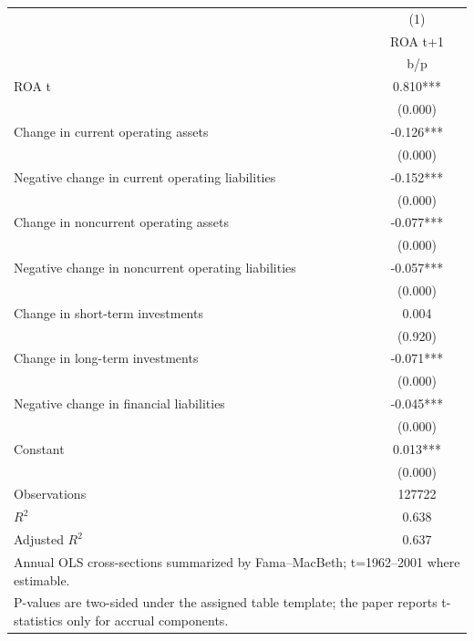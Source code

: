 {
\def\sym#1{\ifmmode^{#1}\else\(^{#1}\)\fi}
\begin{tabular}{l*{1}{c}}
\hline\hline
                    &\multicolumn{1}{c}{(1)}\\
                    &\multicolumn{1}{c}{ROA t+1}\\
                    &         b/p   \\
\hline
ROA t               &       0.810***\\
                    &     (0.000)   \\
Change in current operating assets&      -0.126***\\
                    &     (0.000)   \\
Negative change in current operating liabilities&      -0.152***\\
                    &     (0.000)   \\
Change in noncurrent operating assets&      -0.077***\\
                    &     (0.000)   \\
Negative change in noncurrent operating liabilities&      -0.057***\\
                    &     (0.000)   \\
Change in short-term investments&       0.004   \\
                    &     (0.920)   \\
Change in long-term investments&      -0.071***\\
                    &     (0.000)   \\
Negative change in financial liabilities&      -0.045***\\
                    &     (0.000)   \\
Constant            &       0.013***\\
                    &     (0.000)   \\
\hline
Observations        &      127722   \\
\(R^{2}\)           &       0.638   \\
Adjusted \(R^{2}\)  &       0.637   \\
\hline\hline
\multicolumn{2}{l}{\footnotesize Annual OLS cross-sections summarized by Fama–MacBeth; t=1962–2001 where estimable.}\\
\multicolumn{2}{l}{\footnotesize P-values are two-sided under the assigned table template; the paper reports t-statistics only for accrual components.}\\
\end{tabular}
}

